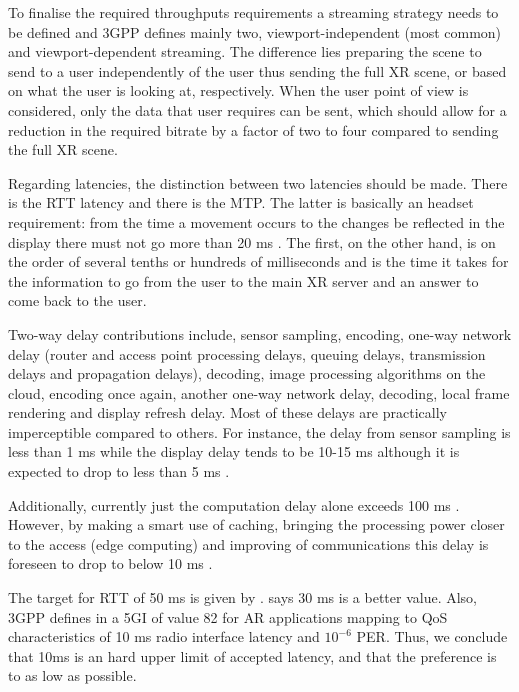 To finalise the required throughputs requirements a streaming strategy needs to be defined and 3GPP \cite{3GPP_xr} defines mainly two, viewport-independent (most common) and viewport-dependent streaming. The difference lies preparing the scene to send to a user independently of the user thus sending the full XR scene, or based on what the user is looking at, respectively. When the user point of view is considered, only the data that user requires can be sent, which should allow for a reduction in the required bitrate by a factor of two to four compared to sending the full XR scene. 


Regarding latencies, the distinction between two latencies should be made. There is the \ac{RTT} latency and there is the \ac{MTP}. The latter is basically an headset requirement: from the time a movement occurs to the changes be reflected in the display there must not go more than 20 ms \cite{3GPP_xr, Elbamby_towards_low_latency_vr}. The first, on the other hand, is on the order of several tenths or hundreds of milliseconds and is the time it takes for the information to go from the user to the main XR server and an answer to come back to the user. %


Two-way delay contributions include, sensor sampling, encoding, one-way network delay (router and access point processing delays, queuing delays, transmission delays and propagation delays), decoding, image processing algorithms on the cloud, encoding once again, another one-way network delay, decoding, local frame rendering and display refresh delay. Most of these delays are practically imperceptible compared to others. For instance, the delay from sensor sampling is less than 1 ms while the display delay tends to be 10-15 ms \cite{bastug_towards_interconnected_vr} although it is expected to drop to less than 5 ms \cite{vr_on_the_edge}. 

Additionally, currently just the computation delay alone exceeds 100 ms \cite{vr_on_the_edge}. However, by making a smart use of caching, bringing the processing power closer to the access (edge computing) and improving of communications \cite{Elbamby_towards_low_latency_vr, bastug_towards_interconnected_vr, 3GPP_xr} this delay is foreseen to drop to below 10 ms \cite{vr_on_the_edge}. 

The target for \ac{RTT} of 50 ms is given by \cite{3GPP_xr}. \cite{vr_on_the_edge} says 30 ms is a better value. Also, 3GPP defines in \cite{3GPP_xr} a \ac{5GI} of value 82 for \ac{AR} applications mapping to \ac{QoS} characteristics of 10 ms radio interface latency and $10^{-6}$ \ac{PER}. Thus, we conclude that 10ms is an hard upper limit of accepted latency, and that the preference is to as low as possible.

